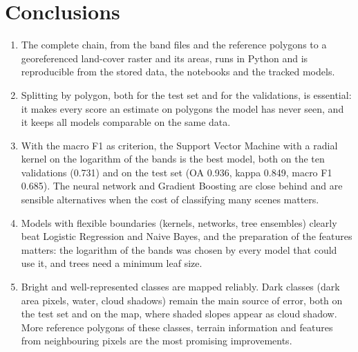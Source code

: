\documentclass[11pt,a4paper]{article}
\begin{document}
\section{Conclusions}

\begin{enumerate}
  \item The complete chain, from the band files and the reference polygons to
  a georeferenced land-cover raster and its areas, runs in Python and is
  reproducible from the stored data, the notebooks and the tracked models.
  \item Splitting by polygon, both for the test set and for the validations,
  is essential: it makes every score an estimate on polygons the model has
  never seen, and it keeps all models comparable on the same data.
  \item With the macro F1 as criterion, the Support Vector Machine with a
  radial kernel on the logarithm of the bands is the best model, both on the
  ten validations (0.731) and on the test set (OA 0.936, kappa 0.849, macro F1
  0.685). The neural network and Gradient Boosting are close behind and are
  sensible alternatives when the cost of classifying many scenes matters.
  \item Models with flexible boundaries (kernels, networks, tree ensembles)
  clearly beat Logistic Regression and Naive Bayes, and the preparation of
  the features matters: the logarithm of the bands was chosen by every model
  that could use it, and trees need a minimum leaf size.
  \item Bright and well-represented classes are mapped reliably. Dark classes
  (dark area pixels, water, cloud shadows) remain the main source of error,
  both on the test set and on the map, where shaded slopes appear as cloud
  shadow. More reference polygons of these classes, terrain information and
  features from neighbouring pixels are the most promising improvements.
\end{enumerate}
\end{document}
